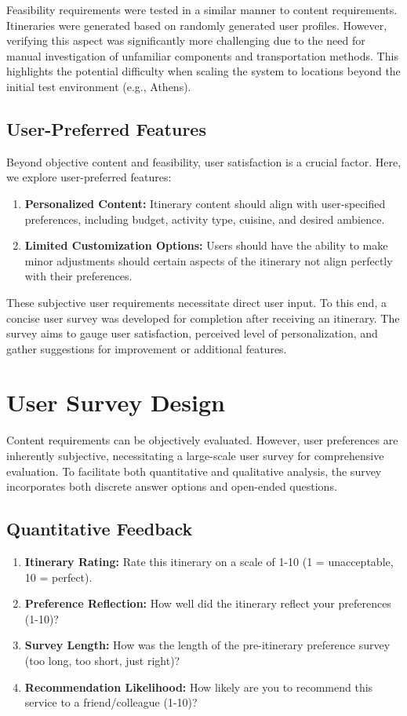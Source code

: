 \documentclass[12pt,a4paper]{report}
\begin{document}
Feasibility requirements were tested in a similar manner to content requirements. Itineraries were generated based on randomly generated user profiles. However, verifying this aspect was significantly more challenging due to the need for manual investigation of unfamiliar components and transportation methods. This highlights the potential difficulty when scaling the system to locations beyond the initial test environment (e.g., Athens).

\subsection{User-Preferred Features}

Beyond objective content and feasibility, user satisfaction is a crucial factor. Here, we explore user-preferred features:
\begin{enumerate}
\item{\textbf{Personalized Content:} Itinerary content should align with user-specified preferences, including budget, activity type, cuisine, and desired ambience.}
\item{\textbf{Limited Customization Options:} Users should have the ability to make minor adjustments should certain aspects of the itinerary not align perfectly with their preferences.}
\end{enumerate}
These subjective user requirements necessitate direct user input. To this end, a concise user survey was developed for completion after receiving an itinerary. The survey aims to gauge user satisfaction, perceived level of personalization, and gather suggestions for improvement or additional features.

\section{User Survey Design}

Content requirements can be objectively evaluated. However, user preferences are inherently subjective, necessitating a large-scale user survey for comprehensive evaluation. To facilitate both quantitative and qualitative analysis, the survey incorporates both discrete answer options and open-ended questions.

\subsection{Quantitative Feedback}

\begin{enumerate}
\item{\textbf{Itinerary Rating:} Rate this itinerary on a scale of 1-10 (1 = unacceptable, 10 = perfect).}
\item{\textbf{Preference Reflection:} How well did the itinerary reflect your preferences (1-10)?}
\item{\textbf{Survey Length:} How was the length of the pre-itinerary preference survey (too long, too short, just right)?}
\item{\textbf{Recommendation Likelihood:} How likely are you to recommend this service to a friend/colleague (1-10)?}
\end{enumerate}
\end{document}
